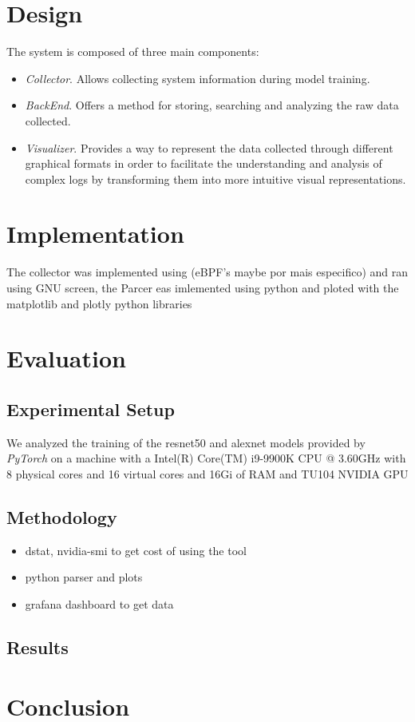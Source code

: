 \documentclass[conference]{IEEEtran}
\begin{document}
\section{Design}
    The system is composed of three main components:
    \begin{itemize}
        \item \textit{Collector}. Allows collecting system information during model training.
        \item \textit{BackEnd}. Offers a method for storing, searching and analyzing the raw data collected.
        \item \textit{Visualizer}. Provides a way to represent the data collected through different graphical formats in order to facilitate the understanding and analysis of complex logs by transforming them into more intuitive visual representations.
    \end{itemize}

\section{Implementation}
    The collector was implemented using (eBPF's maybe por mais especifico) and ran using GNU screen, the Parcer eas imlemented using python and ploted with the matplotlib and plotly python libraries 

\section{Evaluation}
\subsection{Experimental Setup}

We analyzed the training of the resnet50 \cite{resnet50} and alexnet \cite{alexnet} models
provided by \textit{PyTorch} on a machine with a Intel(R) Core(TM) i9-9900K CPU @ 3.60GHz with
8 physical cores and 16 virtual cores and 16Gi of RAM and TU104 NVIDIA GPU


\subsection{Methodology}

\begin{itemize}
    \item dstat, nvidia-smi to get cost of using the tool
    \item python parser and plots
    \item grafana dashboard to get data 
\end{itemize}

\subsection{Results}

\section{Conclusion}


\end{document}
